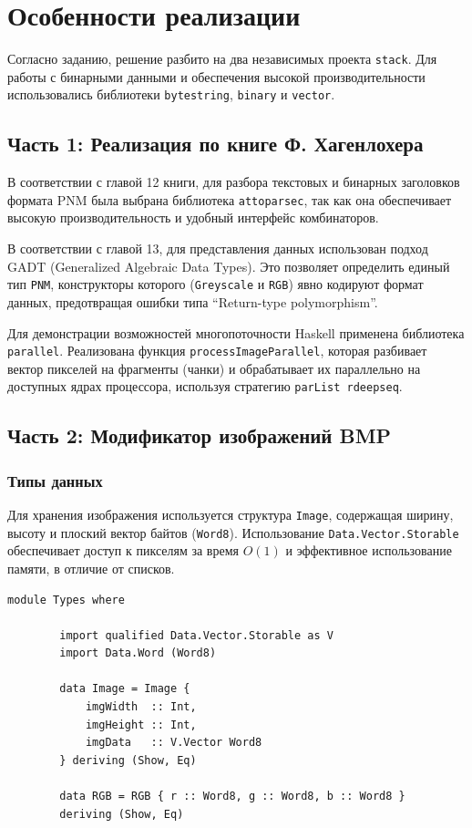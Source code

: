 \documentclass[a4paper, final]{article}
\begin{document}
	\newpage
	\section{Особенности реализации}
	Согласно заданию, решение разбито на два независимых проекта \texttt{stack}. Для работы с бинарными данными и обеспечения высокой производительности использовались библиотеки \texttt{bytestring}, \texttt{binary} и \texttt{vector}.
	
	\subsection{Часть 1: Реализация по книге Ф. Хагенлохера}
	
	В соответствии с главой 12 книги, для разбора текстовых и бинарных заголовков формата PNM была выбрана библиотека \texttt{attoparsec}, так как она обеспечивает высокую производительность и удобный интерфейс комбинаторов.
	
	В соответствии с главой 13, для представления данных использован подход GADT (Generalized Algebraic Data Types). Это позволяет определить единый тип \texttt{PNM}, конструкторы которого (\texttt{Greyscale} и \texttt{RGB}) явно кодируют формат данных, предотвращая ошибки типа ``Return-type polymorphism''.
	
	Для демонстрации возможностей многопоточности Haskell применена библиотека \texttt{parallel}. Реализована функция \texttt{processImageParallel}, которая разбивает вектор пикселей на фрагменты (чанки) и обрабатывает их параллельно на доступных ядрах процессора, используя стратегию \texttt{parList rdeepseq}.
	
	\subsection{Часть 2: Модификатор изображений BMP}
	
	\subsubsection{Типы данных}
	Для хранения изображения используется структура \texttt{Image}, содержащая ширину, высоту и плоский вектор байтов (\texttt{Word8}). Использование \texttt{Data.Vector.Storable} обеспечивает доступ к пикселям за время $O(1)$ и эффективное использование памяти, в отличие от списков.
	
	\begin{lstlisting}[caption={Определение типа Image}, label={lst:image_type}]
		module Types where
		
		import qualified Data.Vector.Storable as V
		import Data.Word (Word8)
		
		data Image = Image {
			imgWidth  :: Int,
			imgHeight :: Int,
			imgData   :: V.Vector Word8 
		} deriving (Show, Eq)
		
		data RGB = RGB { r :: Word8, g :: Word8, b :: Word8 } 
		deriving (Show, Eq)
	\end{lstlisting}
	
\end{document}
